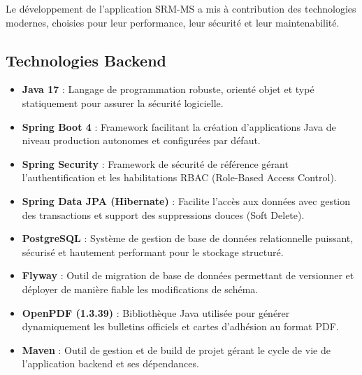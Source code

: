 Le développement de l'application SRM-MS a mis à contribution des technologies modernes, choisies pour leur performance, leur sécurité et leur maintenabilité.

\subsection{Technologies Backend}
\begin{itemize}
    \item \textbf{Java 17} : Langage de programmation robuste, orienté objet et typé statiquement pour assurer la sécurité logicielle.
    \item \textbf{Spring Boot 4} : Framework facilitant la création d'applications Java de niveau production autonomes et configurées par défaut.
    \item \textbf{Spring Security} : Framework de sécurité de référence gérant l'authentification et les habilitations RBAC (Role-Based Access Control).
    \item \textbf{Spring Data JPA (Hibernate)} : Facilite l'accès aux données avec gestion des transactions et support des suppressions douces (Soft Delete).
    \item \textbf{PostgreSQL} : Système de gestion de base de données relationnelle puissant, sécurisé et hautement performant pour le stockage structuré.
    \item \textbf{Flyway} : Outil de migration de base de données permettant de versionner et déployer de manière fiable les modifications de schéma.
    \item \textbf{OpenPDF (1.3.39)} : Bibliothèque Java utilisée pour générer dynamiquement les bulletins officiels et cartes d'adhésion au format PDF.
    \item \textbf{Maven} : Outil de gestion et de build de projet gérant le cycle de vie de l'application backend et ses dépendances.
\end{itemize}

